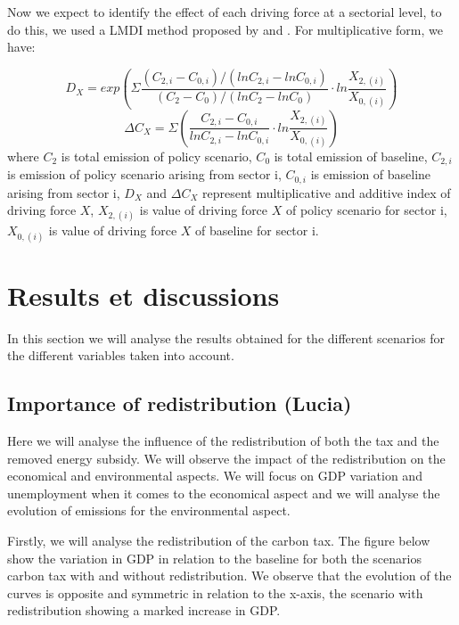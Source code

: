 \documentclass[
]{article}
\begin{document}
Now we expect to identify the effect of each driving force at a
sectorial level, to do this, we used a LMDI method proposed by
\textcite{ang1997} and \textcite{ang2005}. For multiplicative form, we
have:

\[ D_{X} = exp ( \Sigma \frac{(C_{2,i}-C_{0,i})/(lnC_{2,i}-lnC_{0,i})}{(C_{2}-C_{0})/(lnC_{2}-lnC_{0})} \cdot ln \frac{X_{2,(i)}}{X_{0,(i)}} ) \tag{11}\]
\[ \Delta C_{X} =  \Sigma (\frac{C_{2,i}-C_{0,i}}{lnC_{2,i}-lnC_{0,i}} \cdot ln\frac{X_{2,(i)}}{X_{0,(i)}}) \tag{12} \]
where \(C_{2}\) is total emission of policy scenario, \(C_{0}\) is total
emission of baseline, \(C_{2,i}\) is emission of policy scenario arising
from sector i, \(C_{0,i}\) is emission of baseline arising from sector
i, \(D_{X}\) and \(\Delta C_{X}\) represent multiplicative and additive
index of driving force \(X\), \(X_{2,(i)}\) is value of driving force
\(X\) of policy scenario for sector i, \(X_{0,(i)}\) is value of driving
force \(X\) of baseline for sector i.

\hypertarget{results-et-discussions}{%
\section{Results et discussions}\label{results-et-discussions}}

In this section we will analyse the results obtained for the different
scenarios for the different variables taken into account.

\hypertarget{importance-of-redistribution-lucia}{%
\subsection{Importance of redistribution
(Lucia)}\label{importance-of-redistribution-lucia}}

Here we will analyse the influence of the redistribution of both the tax
and the removed energy subsidy. We will observe the impact of the
redistribution on the economical and environmental aspects. We will
focus on GDP variation and unemployment when it comes to the economical
aspect and we will analyse the evolution of emissions for the
environmental aspect.

Firstly, we will analyse the redistribution of the carbon tax. The
figure below show the variation in GDP in relation to the baseline for
both the scenarios carbon tax with and without redistribution. We
observe that the evolution of the curves is opposite and symmetric in
relation to the x-axis, the scenario with redistribution showing a
marked increase in GDP.
\end{document}
